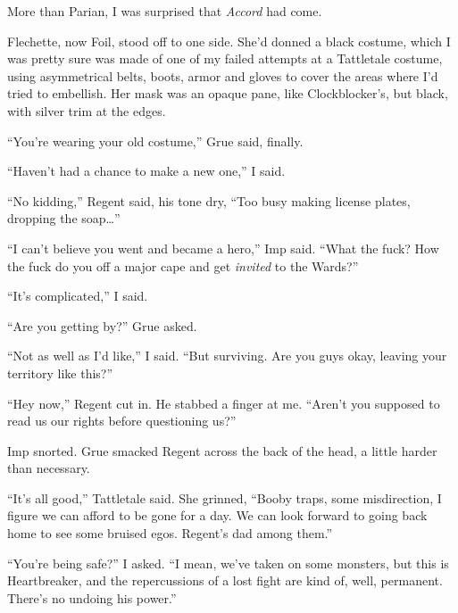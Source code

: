 More than Parian, I was surprised that\emph{ Accord} had come.



Flechette, now Foil, stood off to one side.  She'd donned a black costume, which I was pretty sure was made of one of my failed attempts at a Tattletale costume, using asymmetrical belts, boots, armor and gloves to cover the areas where I'd tried to embellish.  Her mask was an opaque pane, like Clockblocker's, but black, with silver trim at the edges.



``You're wearing your old costume,'' Grue said, finally.



``Haven't had a chance to make a new one,'' I said.



``No kidding,'' Regent said, his tone dry, ``Too busy making license plates, dropping the soap\ldots''



``I can't believe you went and became a hero,'' Imp said.  ``What the fuck?  How the fuck do you off a major cape and get \emph{invited} to the Wards?''



``It's complicated,'' I said.



``Are you getting by?'' Grue asked.



``Not as well as I'd like,'' I said.  ``But surviving.  Are you guys okay, leaving your territory like this?''



``Hey now,'' Regent cut in.  He stabbed a finger at me.  ``Aren't you supposed to read us our rights before questioning us?''



Imp snorted.  Grue smacked Regent across the back of the head, a little harder than necessary.



``It's all good,'' Tattletale said.  She grinned, ``Booby traps, some misdirection, I figure we can afford to be gone for a day.  We can look forward to going back home to see some bruised egos.  Regent's dad among them.''



``You're being safe?'' I asked.  ``I mean, we've taken on some monsters, but this is Heartbreaker, and the repercussions of a lost fight are kind of, well, permanent.  There's no undoing his power.''



